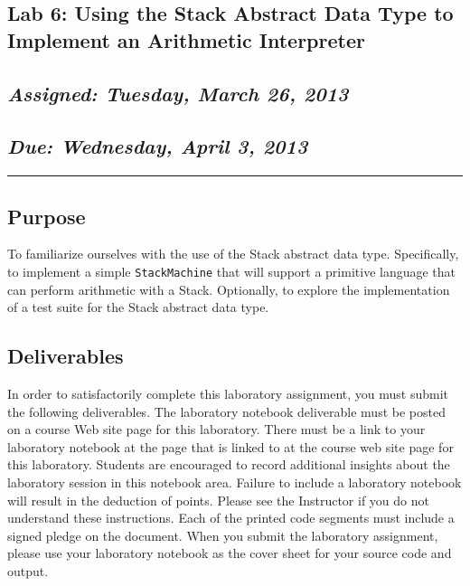 \href{http://www.cs.allegheny.edu/sites/cs112S2013/125}{}

\subsection{Lab 6: Using the Stack Abstract Data Type to Implement an
Arithmetic Interpreter}

\subsection{\emph{Assigned: Tuesday, March 26, 2013}}

\subsection{\emph{Due: Wednesday, April 3, 2013}}

\begin{center}\rule{3in}{0.4pt}\end{center}

\subsection{Purpose}

To familiarize ourselves with the use of the Stack abstract data type.
Specifically, to implement a simple \texttt{StackMachine} that will
support a primitive language that can perform arithmetic with a Stack.
Optionally, to explore the implementation of a test suite for the Stack
abstract data type.

\subsection{Deliverables}

In order to satisfactorily complete this laboratory assignment, you must
submit the following deliverables. The laboratory notebook deliverable
must be posted on a course Web site page for this laboratory. There must
be a link to your laboratory notebook at the page that is linked to at
the course web site page for this laboratory. Students are encouraged to
record additional insights about the laboratory session in this notebook
area. Failure to include a laboratory notebook will result in the
deduction of points. Please see the Instructor if you do not understand
these instructions. Each of the printed code segments must include a
signed pledge on the document. When you submit the laboratory
assignment, please use your laboratory notebook as the cover sheet for
your source code and output.

